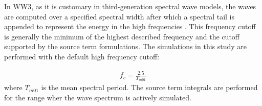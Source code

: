 In WW3, as it is customary in third-generation spectral wave models, the waves are computed over a specified spectral width after which a spectral tail is appended to represent the energy in the high frequencies \citep[e.g.][]{ardhuinObservationSwellDissipation2009}. This frequency cutoff is generally the minimum of the highest described frequency and the cutoff supported by the source term formulations. The simulations in this study are performed with the default high frequency cutoff:

\begin{align}
  f_{c} = \frac{2.5}{T_{m01}}
\end{align}
where $T_{m01}$ is the mean spectral period. The source term integrals are performed for the range wher the wave spectrum is actively simulated.


